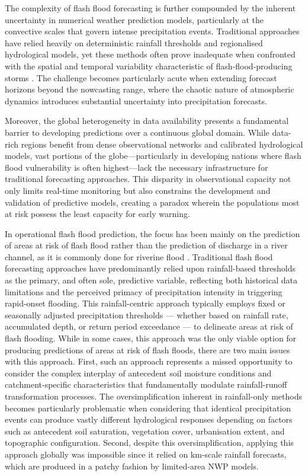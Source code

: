 The complexity of flash flood forecasting is further compounded by the inherent uncertainty in numerical weather prediction models, particularly at the convective scales that govern intense precipitation events. Traditional approaches have relied heavily on deterministic rainfall thresholds and regionalised hydrological models, yet these methods often prove inadequate when confronted with the spatial and temporal variability characteristic of flash-flood-producing storms \citep{Alfieri_2015}. The challenge becomes particularly acute when extending forecast horizons beyond the nowcasting range, where the chaotic nature of atmospheric dynamics introduces substantial uncertainty into precipitation forecasts.

Moreover, the global heterogeneity in data availability presents a fundamental barrier to developing predictions over a continuous global domain. While data-rich regions benefit from dense observational networks and calibrated hydrological models, vast portions of the globe—particularly in developing nations where flash flood vulnerability is often highest—lack the necessary infrastructure for traditional forecasting approaches. This disparity in observational capacity not only limits real-time monitoring but also constrains the development and validation of predictive models, creating a paradox wherein the populations most at risk possess the least capacity for early warning.

In operational flash flood prediction, the focus has been mainly on the prediction of areas at risk of flash flood rather than the prediction of discharge in a river channel, as it is commonly done for riverine flood \citep{Zanchetta_2020}. Traditional flash flood forecasting approaches have predominantly relied upon rainfall-based thresholds as the primary, and often sole, predictive variable, reflecting both historical data limitations and the perceived primacy of precipitation intensity in triggering rapid-onset flooding. This rainfall-centric approach typically employs fixed or seasonally adjusted precipitation thresholds — whether based on rainfall rate, accumulated depth, or return period exceedance — to delineate areas at risk of flash flooding. While in some cases, this approach was the only viable option for producing predictions of areas at risk of flash floods, there are two main issues with this approach. First, such an approach represents a missed opportunity to consider the complex interplay of antecedent soil moisture conditions and catchment-specific characteristics that fundamentally modulate rainfall-runoff transformation processes. The oversimplification inherent in rainfall-only methods becomes particularly problematic when considering that identical precipitation events can produce vastly different hydrological responses depending on factors such as antecedent soil saturation, vegetation cover, urbanisation extent, and topographic configuration. Second, despite this oversimplification, applying this approach globally was impossible since it relied on km-scale rainfall forecasts, which are produced in a patchy fashion by limited-area NWP models. 

